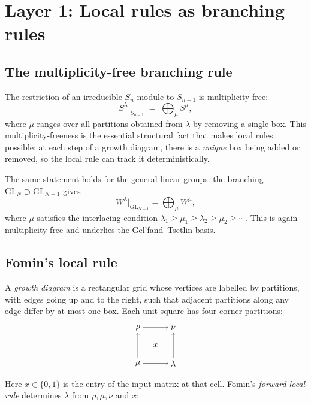 \documentclass[12pt,a4paper]{article}
\theoremstyle{definition}
\theoremstyle{remark}
\begin{document}
\section{Layer 1: Local rules as branching rules}
\label{sec:branching}

\subsection{The multiplicity-free branching rule}

The restriction of an irreducible $S_n$-module to $S_{n-1}$ is
multiplicity-free:
\begin{equation}\label{eq:branching}
  S^\lambda\big|_{S_{n-1}}
  \;=\; \bigoplus_{\mu} S^\mu,
\end{equation}
where $\mu$ ranges over all partitions obtained from $\lambda$ by
removing a single box. This multiplicity-freeness is the essential
structural fact that makes local rules possible: at each step of a
growth diagram, there is a \emph{unique} box being added or removed,
so the local rule can track it deterministically.

The same statement holds for the general linear groups: the branching
$\mathrm{GL}_N \supset \mathrm{GL}_{N-1}$ gives
\[
  W^\lambda\big|_{\mathrm{GL}_{N-1}}
  = \bigoplus_\mu W^\mu,
\]
where $\mu$ satisfies the interlacing condition
$\lambda_1 \geqslant \mu_1 \geqslant \lambda_2 \geqslant \mu_2
\geqslant \cdots$. This is again multiplicity-free and underlies the
Gel'fand--Tsetlin basis.

\subsection{Fomin's local rule}

A \emph{growth diagram} is a rectangular grid whose vertices are
labelled by partitions, with edges going up and to the right,
such that adjacent partitions along any edge differ by at most one box.
Each unit square has four corner partitions:
\[
\begin{tikzpicture}[scale=1.5]
  \node at (0,1) {$\rho$};
  \node at (1,1) {$\nu$};
  \node at (0,0) {$\mu$};
  \node at (1,0) {$\lambda$};
  \node at (0.5,0.5) {$x$};
  \draw[->] (0.15,0) -- (0.85,0);
  \draw[->] (0,0.15) -- (0,0.85);
  \draw[->] (1,0.15) -- (1,0.85);
  \draw[->] (0.15,1) -- (0.85,1);
\end{tikzpicture}
\]
Here $x \in \{0,1\}$ is the entry of the input matrix at that cell.
Fomin's \emph{forward local rule} determines $\lambda$ from
$\rho, \mu, \nu$ and $x$:
\end{document}
